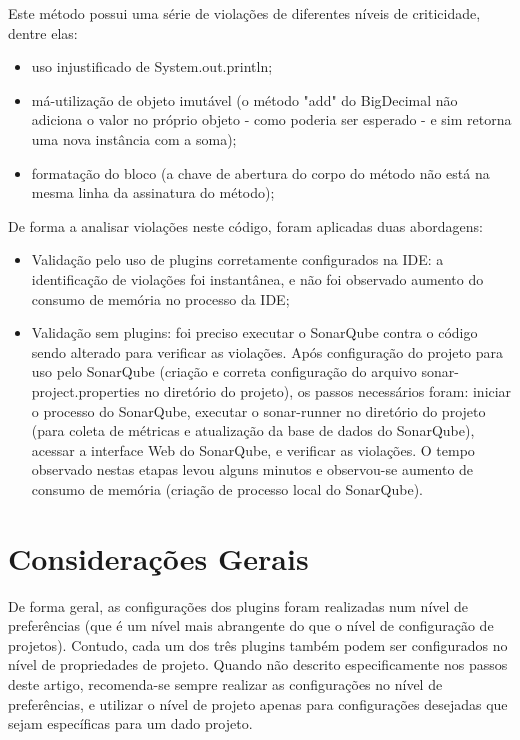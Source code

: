 \documentclass[12pt,journal,compsoc]{IEEEtran}
\begin{document}
Este método possui uma série de violações de diferentes níveis de criticidade, dentre elas: 

\begin{itemize}
\item uso injustificado de System.out.println;
\item má-utilização de objeto imutável (o método "add" do BigDecimal não adiciona o valor no próprio objeto - como poderia ser esperado - e sim retorna uma nova instância com a soma);
\item formatação do bloco (a chave de abertura do corpo do método não está na mesma linha da assinatura do método);
\end{itemize}

De forma a analisar violações neste código, foram aplicadas duas abordagens:

\begin{itemize}
\item Validação pelo uso de plugins corretamente configurados na IDE: a identificação de violações foi instantânea, e não foi observado aumento do consumo de memória no processo da IDE;
\item Validação sem plugins: foi preciso executar o SonarQube contra o código sendo alterado para verificar as violações. Após configuração do projeto para uso pelo SonarQube (criação e correta configuração do arquivo sonar-project.properties no diretório do projeto), os passos necessários foram: iniciar o processo do SonarQube, executar o sonar-runner no diretório do projeto (para coleta de métricas e atualização da base de dados do SonarQube), acessar a interface Web do SonarQube, e verificar as violações. O tempo observado nestas etapas levou alguns minutos e observou-se aumento de consumo de memória (criação de processo local do SonarQube). \end{itemize}


\section{Considerações Gerais}

De forma geral, as configurações dos plugins foram realizadas num nível de preferências (que é um nível mais abrangente do que o nível de configuração de projetos). Contudo, cada um dos três plugins também podem ser configurados no nível de propriedades de projeto. Quando não descrito especificamente nos passos deste artigo, recomenda-se sempre realizar as configurações no nível de preferências, e utilizar o nível de projeto apenas para configurações desejadas que sejam específicas para um dado projeto.
\end{document}
